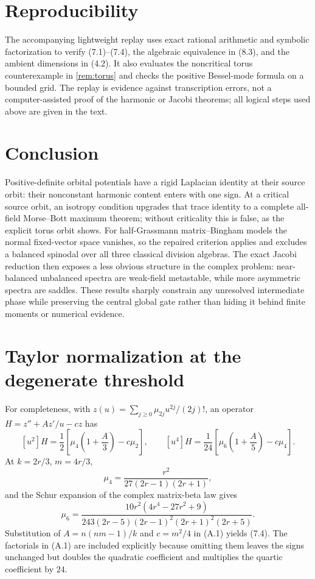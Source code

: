 \documentclass[11pt]{article}
\begin{document}
\section{Reproducibility}

The accompanying lightweight replay uses exact rational arithmetic and
symbolic factorization to verify (7.1)--(7.4), the algebraic
equivalence in (8.3), and the ambient dimensions in (4.2).  It
also evaluates the noncritical torus counterexample in \cref{rem:torus} and
checks the positive Bessel-mode formula on a bounded grid.  The replay
is evidence against transcription errors, not a computer-assisted proof of
the harmonic or Jacobi theorems; all logical steps used above are given in
the text.

\section{Conclusion}

Positive-definite orbital potentials have a rigid Laplacian identity at their
source orbit: their nonconstant harmonic content enters with one sign.  At a
critical source orbit, an isotropy condition upgrades that trace identity to
a complete all-field Morse--Bott maximum theorem; without criticality this is
false, as the explicit torus orbit shows.  For half-Grassmann
matrix--Bingham models the normal fixed-vector space vanishes, so the repaired
criterion applies and
excludes a balanced spinodal over all three classical division algebras.
The exact Jacobi reduction then exposes a less obvious structure in the
complex problem: near-balanced unbalanced spectra are weak-field metastable,
while more asymmetric spectra are saddles.  These results sharply constrain
any unresolved intermediate phase while preserving the central global gate
rather than hiding it behind finite moments or numerical evidence.

\appendix
\section{Taylor normalization at the degenerate threshold}

For completeness, with $z(u)=\sum_{j\ge0}\mu_{2j}u^{2j}/(2j)!$, an operator
$H=z''+Az'/u-cz$ has
\[
 [u^2]H=\frac12\left[\mu_4\left(1+\frac A3\right)-c\mu_2\right],\qquad
 [u^4]H=\frac1{24}\left[\mu_6\left(1+\frac A5\right)-c\mu_4\right].       \tag{A.1}
\]
At $k=2r/3$, $m=4r/3$,
\[
 \mu_4=\frac{r^2}{27(2r-1)(2r+1)},                          \tag{A.2}
\]
and the Schur expansion of the complex matrix-beta law gives
\[
 \mu_6=\frac{10r^2(4r^4-27r^2+9)}
 {243(2r-5)(2r-1)^2(2r+1)^2(2r+5)}.                         \tag{A.3}
\]
Substitution of $A=n(nm-1)/k$ and $c=m^2/4$ in (A.1) yields
(7.4).  The factorials in (A.1) are included explicitly because
omitting them leaves the signs unchanged but doubles the quadratic
coefficient and multiplies the quartic coefficient by $24$.
\end{document}

